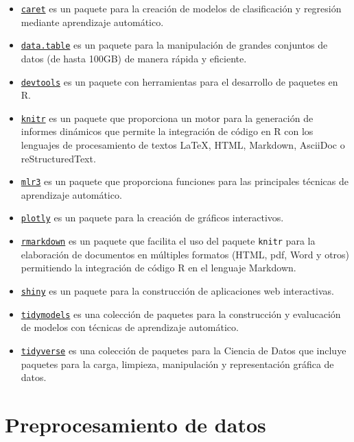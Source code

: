 \documentclass[
  a4paper,
]{scrreport}
\providecommand{\tightlist}{%
  \setlength{\itemsep}{0pt}\setlength{\parskip}{0pt}}\usepackage{longtable,booktabs,array}
\theoremstyle{definition}
\theoremstyle{definition}
\theoremstyle{remark}
\begin{document}
\begin{itemize}
\tightlist
\item
  \href{https://topepo.github.io/caret/index.html}{\texttt{caret}} es un
  paquete para la creación de modelos de clasificación y regresión
  mediante aprendizaje automático.
\item
  \href{https://www.rdocumentation.org/packages/data.table/}{\texttt{data.table}}
  es un paquete para la manipulación de grandes conjuntos de datos (de
  hasta 100GB) de manera rápida y eficiente.
\item
  \href{https://www.rdocumentation.org/packages/devtools/}{\texttt{devtools}}
  es un paquete con herramientas para el desarrollo de paquetes en R.
\item
  \href{https://www.r-project.org/nosvn/pandoc/knitr.html}{\texttt{knitr}}
  es un paquete que proporciona un motor para la generación de informes
  dinámicos que permite la integración de código en R con los lenguajes
  de procesamiento de textos LaTeX, HTML, Markdown, AsciiDoc o
  reStructuredText.
\item
  \href{https://mlr3.mlr-org.com/}{\texttt{mlr3}} es un paquete que
  proporciona funciones para las principales técnicas de aprendizaje
  automático.
\item
  \href{https://plotly.com/r/}{\texttt{plotly}} es un paquete para la
  creación de gráficos interactivos.
\item
  \href{https://rmarkdown.rstudio.com/}{\texttt{rmarkdown}} es un
  paquete que facilita el uso del paquete \texttt{knitr} para la
  elaboración de documentos en múltiples formatos (HTML, pdf, Word y
  otros) permitiendo la integración de código R en el lenguaje Markdown.
\item
  \href{https://shiny.rstudio.com/}{\texttt{shiny}} es un paquete para
  la construcción de aplicaciones web interactivas.
\item
  \href{https://www.tidymodels.org/}{\texttt{tidymodels}} es una
  colección de paquetes para la construcción y evalucación de modelos
  con técnicas de aprendizaje automático.
\item
  \href{https://www.tidyverse.org/}{\texttt{tidyverse}} es una colección
  de paquetes para la Ciencia de Datos que incluye paquetes para la
  carga, limpieza, manipulación y representación gráfica de datos.
\end{itemize}


\hypertarget{preprocesamiento-de-datos}{%
\chapter{Preprocesamiento de datos}\label{preprocesamiento-de-datos}}
\end{document}
